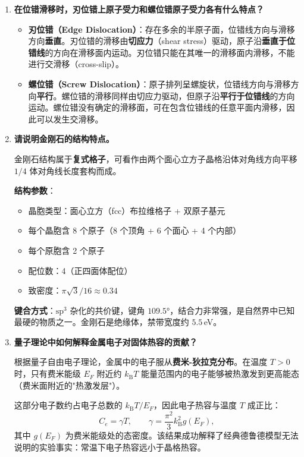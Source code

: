 \begin{enumerate}[label=\textbf{\arabic*.}, leftmargin=2em, itemsep=0.8em, resume]
\item \textbf{在位错滑移时，刃位错上原子受力和螺位错原子受力各有什么特点？}

\begin{itemize}[nosep]
    \item \textbf{刃位错（Edge Dislocation）}：存在多余的半原子面，位错线方向与滑移方向\textbf{垂直}。刃位错的滑移由\textbf{切应力}（shear stress）驱动，原子沿\textbf{垂直于位错线}的方向在滑移面内运动。刃位错只能在其唯一的滑移面内滑移，不能进行交滑移（cross-slip）。
    \item \textbf{螺位错（Screw Dislocation）}：原子排列呈螺旋状，位错线方向与滑移方向\textbf{平行}。螺位错的滑移同样由切应力驱动，但原子沿\textbf{平行于位错线}的方向运动。螺位错没有确定的滑移面，可在包含位错线的任意平面内滑移，因此可以发生交滑移。
\end{itemize}

\item \textbf{请说明金刚石的结构特点。}

金刚石结构属于\textbf{复式格子}，可看作由两个面心立方子晶格沿体对角线方向平移 $1/4$ 体对角线长度套构而成。

\textbf{结构参数}：
\begin{itemize}[nosep]
    \item 晶胞类型：面心立方（fcc）布拉维格子 + 双原子基元
    \item 每个晶胞含 8 个原子（8 个顶角 + 6 个面心 + 4 个内部）
    \item 每个原胞含 2 个原子
    \item 配位数：4（正四面体配位）
    \item 致密度：$\pi\sqrt{3}/16 \approx 0.34$
\end{itemize}

\textbf{键合方式}：$\text{sp}^3$ 杂化的共价键，键角 $109.5°$，结合力非常强，是自然界中已知最硬的物质之一。金刚石是绝缘体，禁带宽度约 $5.5\,$eV。

\item \textbf{量子理论中如何解释金属电子对固体热容的贡献？}

根据量子自由电子理论，金属中的电子服从\textbf{费米-狄拉克分布}。在温度 $T > 0$ 时，只有费米能级 $E_F$ 附近约 $k_{\text{B}}T$ 能量范围内的电子能够被热激发到更高能态（费米面附近的"热激发层"）。

这部分电子数约占电子总数的 $k_{\text{B}}T/E_F$，因此电子热容与温度 $T$ 成正比：
\[
    C_e = \gamma T, \qquad \gamma = \frac{\pi^2}{3} k_{\text{B}}^2 g(E_F),
\]
其中 $g(E_F)$ 为费米能级处的态密度。该结果成功解释了经典德鲁德模型无法说明的实验事实：常温下电子热容远小于晶格热容。


\end{enumerate}
